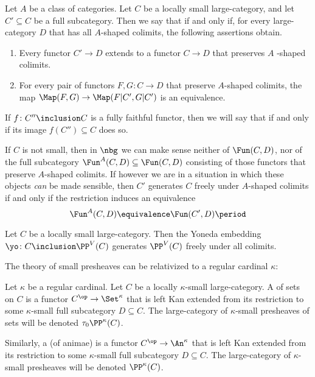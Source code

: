 \begin{definition}
	Let $ A $ be a class of categories.
	Let $ C $ be a locally small large-category,
	and let $ C' \subseteq C $ be a full subcategory.
	Then we say that
	if and only if,
	for every large-category $ D $
	that has all $ A $-shaped colimits,
	the following assertions obtain.
	\begin{enumerate}
		\item Every functor $ C' \to D $ extends
			to a functor $ C \to D $
			that preserves $ A $ -shaped colimits.
		\item For every pair of functors
			$ F, G \colon C \to D $
			that preserve $ A $-shaped colimits,
			the map
			$ \Map(F, G) \to \Map(F|C', G|C' ) $
			is an equivalence.
	\end{enumerate}
	If $ f \colon C'' \inclusion C $ is a fully faithful functor,
	then we will say that
	if and only if its image $ f(C'') \subseteq C $ does so.
\end{definition}

\begin{remark}
	If $ C $ is not small, then in $ \nbg $
	we can make sense neither of $ \Fun(C,D) $,
	nor of the full subcategory
	$ \Fun^{A}(C, D) \subseteq \Fun(C,D) $
	consisting of those functors that preserve
	$ A $-shaped colimits.
	If however we are in a situation in which
	these objects \emph{can} be made sensible,
	then $ C' $ generates $ C $ freely under
	$ A $-shaped colimits
	if and only if the restriction induces an equivalence
	\[ \Fun^A(C, D) \equivalence \Fun(C', D) \period \]
\end{remark}

\begin{proposition}%
	\label{prp:PPsmisfreelygenerated}
	Let $ C $ be a locally small large-category.
	Then the Yoneda embedding
	$ \yo \colon C \inclusion \PP^V(C) $
	generates $ \PP^V(C) $ freely under all colimits.
\end{proposition}

The theory of small presheaves can be relativized
to a regular cardinal $ \kappa $:

\begin{definition}
	Let $ \kappa $ be a regular cardinal.
	Let $ C $ be a locally $ \kappa $-small large-category.
	A  of sets on $ C $
	is a functor $ C^{\op} \to \Set^{\kappa} $
	that is left Kan extended from its restriction to
	some $ \kappa $-small full subcategory $ D \subseteq C $.
	The large-category of $ \kappa $-small presheaves of sets
	will be denoted $ \tau_0\PP^{\kappa}(C) $.

	Similarly, a 
	(of animae) is a functor $ C^{\op} \to \An^{\kappa} $
	that is left Kan extended from its restriction to 
	some $ \kappa $-small full subcategory $ D \subseteq C $.
	The large-category of $ \kappa $-small presheaves
	will be denoted $ \PP^{\kappa}(C) $.
\end{definition}

